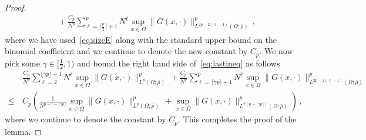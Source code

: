 \documentclass[10pt,a4paper]{amsart}
\begin{document}
\begin{proof}
\begin{align}
& \, + \frac{{C_p}}{N^{p}} \sum_{\ell=\lceil\frac p2\rceil +1}^{p} N^{\ell} \sup_{x \in \Omega} \lVert  G(x,\cdot)\rVert_{L^{2p-2(\ell-1)}(\Omega;\bar\rho)}^{p}\label{eq:lastineq} \, ,
\end{align}
where we have used~\eqref{eq:sizeE} along with the standard upper bound on the binomial coefficient and we continue to denote the new constant by $C_p$. We now pick some $\gamma \in [\frac12,1)$ and bound the right hand side of~\eqref{eq:lastineq} as follows
\begin{align}
&\,\frac{{C_p}}{N^{p}} \sum_{\ell=2}^{\lfloor\gamma p\rfloor +1}N^{\ell}\sup_{x \in \Omega} \lVert  G(x,\cdot)\rVert_{L^p(\Omega;\bar\rho)}^{p}\, + \frac{{C_p}}{N^{p}} \sum_{\ell=\lceil\gamma p\rceil +1}^{p} N^{\ell} \sup_{x \in \Omega} \lVert  G(x,\cdot)\rVert_{L^{2p-2(\ell-1)}(\Omega;\bar\rho)}^{p} \\
\leq & \,C_p\left( \frac{1}{N^{p-1-\lfloor \gamma p \rfloor}} \sup_{x \in \Omega} \lVert  G(x,\cdot)\rVert_{L^p(\Omega;\bar\rho)}^{p}\, +  \sup_{x \in \Omega} \lVert  G(x,\cdot)\rVert_{L^{2(p-\lceil \gamma p \rceil)}(\Omega;\bar\rho)}^{p}\right) \, ,
\end{align}
where we continue to denote the constant by $C_p$. This completes the proof of the lemma.
\end{proof}
\end{document}

